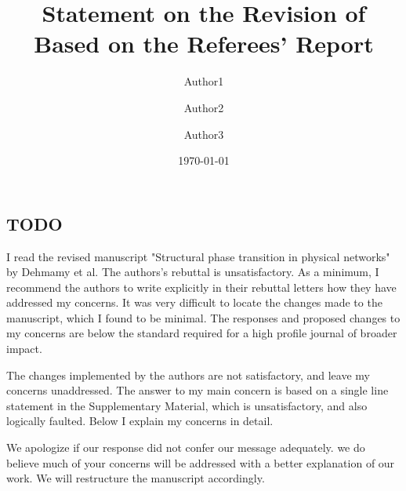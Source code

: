 \documentclass[11pt]{article}
\title{Statement on the Revision of \meta{Paper ID} \\
  Based on the Referees' Report}
\author{Author1 \and Author2 \and Author3}
\date{\today}
\newcommand{\outNim}[1]{}
\newcommand\meta[1]{$\langle\hbox{#1}\rangle$}
\newcommand\PaperTitle[1]{``\textit{#1}''}
\begin{document}
\subsection*{TODO}

 \linespread{1}
\outNim{
\begin{enumerate}
    \item .
\end{enumerate}
}
 \linespread{1.5}


\begin{response}{
I read the revised manuscript "Structural phase transition in physical networks" by Dehmamy et al. The authors's rebuttal is unsatisfactory. As a minimum, I recommend the authors to write explicitly in their rebuttal letters how they have addressed my concerns. It was very difficult to locate the changes made to the manuscript, which I found to be minimal. The responses and proposed changes to my concerns are below the standard required for a high profile journal of broader impact. 

The changes implemented by the authors are not satisfactory, and leave my concerns unaddressed. The answer to my main concern is based on a single line statement in the Supplementary Material, which is unsatisfactory, and also logically faulted. Below I explain my concerns in detail. 
}
We apologize if our response did not confer our message adequately.
we do believe much of your concerns will be addressed with a better explanation of our work.
We will restructure the manuscript accordingly. 
\end{response}
\end{document}
